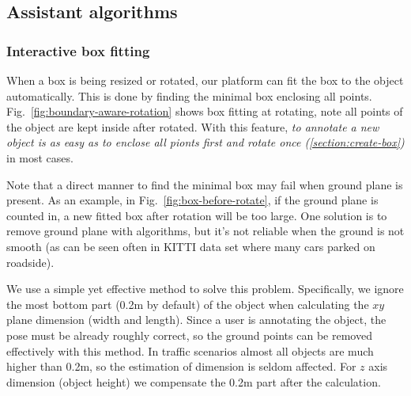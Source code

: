 \documentclass[letterpaper, 10 pt, conference]{ieeeconf}  %
\begin{document}
\subsection{Assistant algorithms}


\subsubsection{Interactive box fitting}
\label{section:auto-fitting}
When a box is being resized or rotated, our platform can fit the box to the object automatically. This is done by finding the minimal box enclosing all points. Fig.~\ref{fig:boundary-aware-rotation} shows box fitting at rotating, note all points of the object are kept inside after rotated. With this feature, \emph{to annotate a new object is as easy as to enclose all pionts first and rotate once (\ref{section:create-box})} in most cases.

Note that a direct manner to find the minimal box may fail when ground plane is present. As an example, in Fig.~\ref{fig:box-before-rotate}, if the ground plane is counted in, a new fitted box after rotation will be too large. One solution is to remove ground plane with algorithms, but it's not reliable when the ground is not smooth (as can be seen often in KITTI data set\cite{Geiger2012CVPR} where many cars parked on roadside).

We use a simple yet effective method to solve this problem. Specifically, we  ignore the most bottom part (0.2m by default) of the object when calculating the $xy$ plane dimension (width and length). Since a user is annotating the object, the pose  must be already roughly correct, so the  ground points can be removed effectively with this method. In traffic scenarios almost all objects are much higher than 0.2m, so the estimation of dimension is  seldom affected. For $z$ axis dimension (object height) we compensate the 0.2m part after the calculation. 
\end{document}

